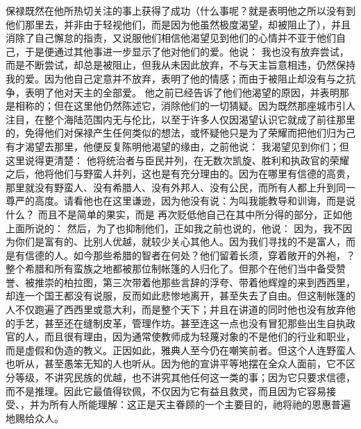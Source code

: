 保禄既然在他所热切关注的事上获得了成功（什么事呢？就是表明他之所以没有到他们那里去，并非由于轻视他们，而是因为他虽然极度渴望，却被阻止了），并且消除了自己懈怠的指责，又说服他们相信他渴望见到他们的心情并不亚于他们自己，于是便通过其他事进一步显示了他对他们的爱。他说： 我也没有放弃尝试，而是不断尝试，却总是被阻止，但我从未因此放弃，不与天主旨意相违，仍然保持我的爱。因为他自己定意并不放弃，表明了他的情感；而由于被阻止却没有与之抗争，表明了他对天主的全部爱。 他之前已经告诉了他们他渴望的原因，并表明那是相称的；但在这里他仍然陈述它，消除他们的一切猜疑。因为既然那座城市引人注目，在整个海陆范围内无与伦比，以至于许多人仅因渴望认识它就成了前往那里的，免得他们对保禄产生任何类似的想法，或怀疑他只是为了荣耀而把他们归为己有才渴望去那里，他便反复陈明他渴望的缘由，之前他说： 我渴望见到你们；但这里说得更清楚： 他将统治者与臣民并列，在无数次凯旋、胜利和执政官的荣耀之后，他将他们与野蛮人并列，这也是有充分理由的。因为在哪里有信德的高贵，那里就没有野蛮人、没有希腊人、没有外邦人、没有公民，而所有人都上升到同一尊严的高度。请看他也在这里谦逊，因为他没有说：为叫我能教导和训诲，而是说什么？ 而且不是简单的果实，而是 再次贬低他自己在其中所分得的部分，正如他上面所说的： 然后，为了也抑制他们，正如我之前也说的，他说： 因为，我不因为你们是富有的、比别人优越，就较少关心其他人。因为我们寻找的不是富人，而是有信德的人。如今那些希腊的智者在何处？他们留着长须，穿着敞开的外袍，？整个希腊和所有蛮族之地都被那位制帐篷的人归化了。但那个在他们当中备受赞誉、被推崇的柏拉图，第三次带着他那些言辞的浮夸、带着他辉煌的来到西西里，却连一个国王都没有说服，反而如此悲惨地离开，甚至失去了自由。但这制帐篷的人不仅跑遍了西西里或意大利，而是整个天下；并且在讲道的同时他也没有放弃他的手艺，甚至还在缝制皮革，管理作坊。甚至连这一点也没有冒犯那些出生自执政官的人，而且很有理由，因为通常使教师成为轻蔑对象的不是他们的行业和职业，而是虚假和伪造的教义。正因如此，雅典人至今仍在嘲笑前者。但这个人连野蛮人也听从，甚至愚笨无知的人也听从。因为他的宣讲平等地摆在全众人面前，它不区分等级，不讲究民族的优越，也不讲究其他任何这一类的事；因为它只要求信德，而不是推理。因此它最值得钦佩，不仅因为它有益且救灵，而且因为它容易接受、，并为所有人所能理解：这正是天主眷顾的一个主要目的，祂将祂的恩惠普遍地赐给众人。\par


